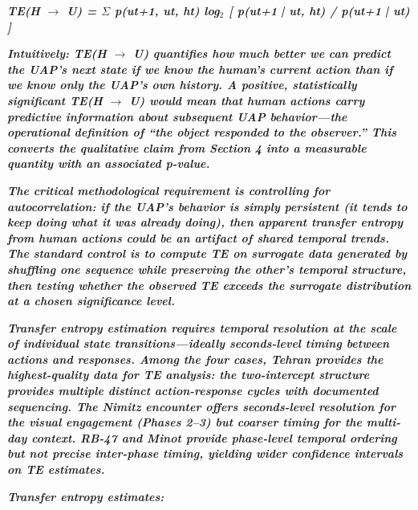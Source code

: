 \documentclass[11pt,letterpaper]{article}
\begin{document}
\textbf{\textit{TE(H $\rightarrow$ U) = $\Sigma$ p(u}}\textbf{\textit{t+1}}\textbf{\textit{, u}}\textbf{\textit{t}}\textbf{\textit{, h}}\textbf{\textit{t}}\textbf{\textit{) log$_2$ [ p(u}}\textbf{\textit{t+1}}\textbf{\textit{ | u}}\textbf{\textit{t}}\textbf{\textit{, h}}\textbf{\textit{t}}\textbf{\textit{) / p(u}}\textbf{\textit{t+1}}\textbf{\textit{ | u}}\textbf{\textit{t}}\textbf{\textit{) ]}}


\textbf{\textit{Intuitively: TE(H $\rightarrow$ U) quantifies how much better we can predict the UAP's next state if we know the human's current action than if we know only the UAP's own history. A positive, statistically significant TE(H $\rightarrow$ U) would mean that human actions carry predictive information about subsequent UAP behavior---the operational definition of ``the object responded to the observer.'' This converts the qualitative claim from Section 4 into a measurable quantity with an associated p-value.}}


\textbf{\textit{The critical methodological requirement is controlling for autocorrelation: if the UAP's behavior is simply persistent (it tends to keep doing what it was already doing), then apparent transfer entropy from human actions could be an artifact of shared temporal trends. The standard control is to compute TE on surrogate data generated by shuffling one sequence while preserving the other's temporal structure, then testing whether the observed TE exceeds the surrogate distribution at a chosen significance level.}}


\textbf{\textit{Transfer entropy estimation requires temporal resolution at the scale of individual state transitions---ideally seconds-level timing between actions and responses. Among the four cases, Tehran provides the highest-quality data for TE analysis: the two-intercept structure provides multiple distinct action-response cycles with documented sequencing. The Nimitz encounter offers seconds-level resolution for the visual engagement (Phases 2--3) but coarser timing for the multi-day context. RB-47 and Minot provide phase-level temporal ordering but not precise inter-phase timing, yielding wider confidence intervals on TE estimates.}}


\textbf{\textit{Transfer entropy estimates:}}
\end{document}
